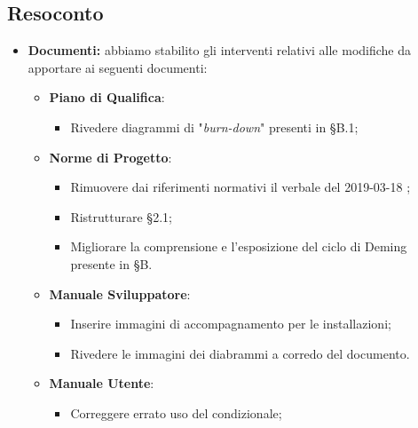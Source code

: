 \subsection{Resoconto}
\begin{itemize}
	\item{ \textbf{Documenti:} abbiamo stabilito gli interventi relativi alle modifiche da apportare ai seguenti documenti:
		\begin{itemize}
			\item \textbf{Piano di Qualifica}: 
			\begin{itemize}
				\item Rivedere diagrammi di "\emph{burn-down}" presenti in §B.1;
			\end{itemize}
			\item \textbf{Norme di Progetto}:
			\begin{itemize}
				\item Rimuovere dai riferimenti normativi il verbale del 2019-03-18 ;
				\item Ristrutturare §2.1;
				\item Migliorare la comprensione e l'esposizione del ciclo di Deming presente in §B.
			\end{itemize}
					\item \textbf{Manuale Sviluppatore}:
			\begin{itemize}
				\item Inserire immagini di accompagnamento per le installazioni;
				\item Rivedere le immagini dei diabrammi a corredo del documento.
			\end{itemize}
				\item \textbf{Manuale Utente}:
			\begin{itemize}
				\item Correggere errato uso del condizionale;
			\end{itemize}
		\end{itemize}}	

\end{itemize}

